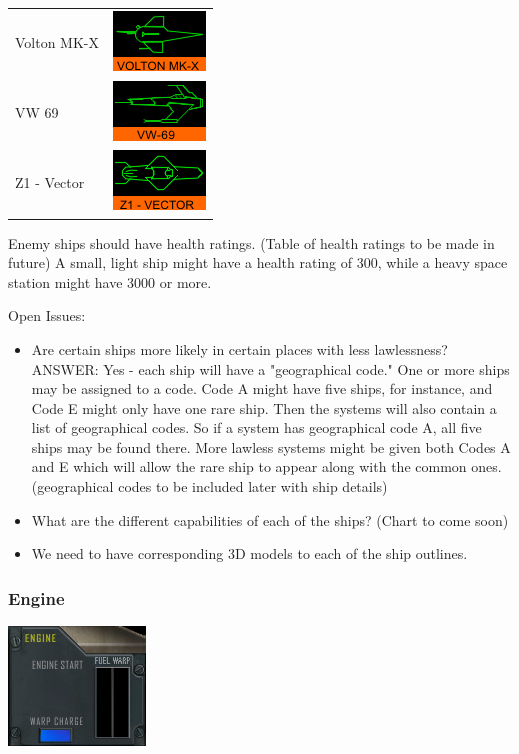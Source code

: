 \begin{itemize}
\begin{tabular}{ | l | l | }
Volton MK-X & \includegraphics{images/ship_volton_mk_x.png} \\
VW 69 & \includegraphics{images/ship_VW-69.png} \\
Z1 - Vector & \includegraphics{images/ship_z1_vector.png} \\
\hline
\end{tabular}

Enemy ships should have health ratings. (Table of health ratings to be made in future) A small, light ship might have a health rating of 300, while a heavy space station might have 3000 or more. 


Open Issues:
\begin{itemize}
\item Are certain ships more likely in certain places with less lawlessness? ANSWER: Yes - each ship will have a "geographical code." One or more ships may be assigned to a code. Code A might have five ships, for instance, and Code E might only have one rare ship. Then the systems will also contain a list of geographical codes. So if a system has geographical code A, all five ships may be found there. More lawless systems might be given both Codes A and E which will allow the rare ship to appear along with the common ones.  (geographical codes to be included later with ship details)
\item What are the different capabilities of each of the ships? (Chart to come soon)
\item We need to have corresponding 3D models to each of the ship outlines.
\end{itemize}

\subsubsection{Engine}
\includegraphics[scale=0.70]{images/engine.png}


\end{itemize}

